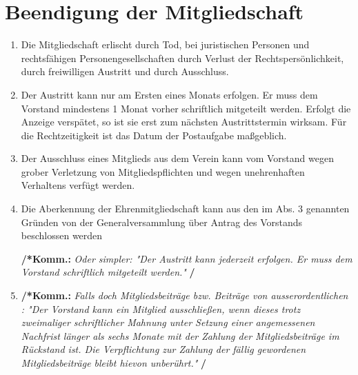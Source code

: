 \documentclass[a4paper,12pt]{article}
\newcommand{\comment}[1]{{\bf /*Komm.:} \textit{#1} {\bf */}}
\begin{document}
\section{Beendigung der Mitgliedschaft} %
\begin{enumerate}
\item Die Mitgliedschaft erlischt durch Tod, bei juristischen Personen und rechtsfähigen Personengesellschaften durch Verlust der Rechtspersönlichkeit, durch freiwilligen Austritt und durch Ausschluss.

\item Der Austritt kann nur am Ersten eines Monats erfolgen. Er muss dem Vorstand mindestens 1 Monat vorher schriftlich mitgeteilt werden. Erfolgt die Anzeige verspätet, so ist sie erst zum nächsten Austrittstermin wirksam. Für die Rechtzeitigkeit ist das Datum der Postaufgabe maßgeblich.
\item Der Ausschluss eines Mitglieds aus dem Verein kann vom Vorstand wegen grober Verletzung von Mitgliedspflichten und wegen unehrenhaften Verhaltens verfügt werden.
\item Die Aberkennung der Ehrenmitgliedschaft kann aus den im Abs. 3 genannten Gründen von der Generalversammlung über Antrag des Vorstands beschlossen werden

\comment{Oder simpler: "Der Austritt kann jederzeit erfolgen. Er muss dem Vorstand schriftlich mitgeteilt werden." }
\item \comment{Falls doch Mitgliedsbeiträge bzw. Beiträge von ausserordentlichen : "Der Vorstand kann ein Mitglied ausschließen, wenn dieses trotz zweimaliger schriftlicher Mahnung unter Setzung einer angemessenen Nachfrist länger als sechs Monate mit der Zahlung der Mitgliedsbeiträge im Rückstand ist. Die Verpflichtung zur Zahlung der fällig gewordenen Mitgliedsbeiträge bleibt hievon unberührt."}

\end{enumerate}
\end{document}
